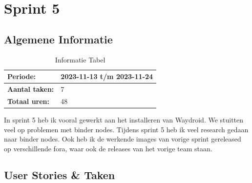 \documentclass[a4paper]{report}
\begin{document}
\chapter{Sprint 5}
\section{Algemene Informatie}
\begin{table}[H]
\begin{tabularx}{0.6\textwidth}{|X|X|}
  \hline
  \cellcolor[HTML]{99ccff} \textbf{Periode:} & 2023-11-13 t/m 2023-11-24 \\ 
  \hline
  \cellcolor[HTML]{99ccff} \textbf{Aantal taken:} & 7 \\ 
  \hline
  \cellcolor[HTML]{99ccff} \textbf{Totaal uren:} & 48 \\ 
  \hline
\end{tabularx}
\caption{Informatie Tabel}
\label{table:it5:general}
\end{table}
In sprint 5 heb ik vooral gewerkt aan het installeren van Waydroid.
We stuitten veel op problemen met binder nodes. Tijdens sprint 5 heb ik veel research gedaan naar binder nodes.
Ook heb ik de werkende images van vorige sprint gereleased op verschillende fora, waar ook de releases van het vorige team staan.


\section{User Stories \& Taken}
\end{document}
